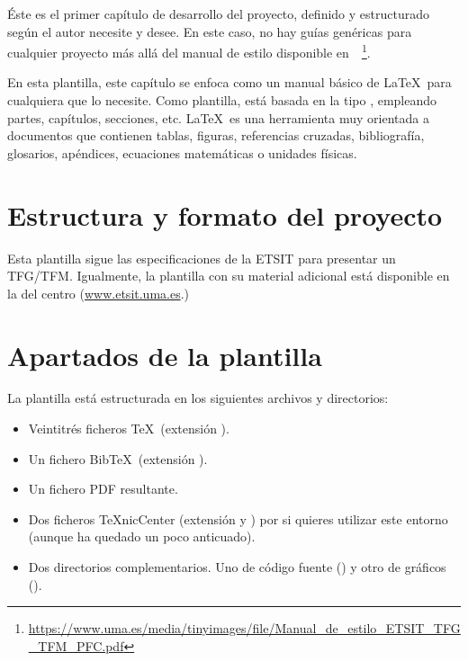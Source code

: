 \label{chp:ManLaTeX}
\minitoc

\begin{sinopsis}
\label{sec:chpltx:sinop}
Éste es el primer capítulo de desarrollo del proyecto, definido y estructurado según el autor necesite y desee. En este caso, no hay guías genéricas para cualquier proyecto más allá del manual de estilo disponible en~\cite{GuiaEstilo}~\footnote{\url{https://www.uma.es/media/tinyimages/file/Manual_de_estilo_ETSIT_TFG_TFM_PFC.pdf}}.

En esta plantilla, este capítulo se enfoca como un manual básico de \LaTeX\ para cualquiera que lo necesite. Como plantilla, está basada en la  tipo , empleando partes, capítulos, secciones, etc. \LaTeX\ es una herramienta muy orientada a documentos que contienen tablas, figuras, referencias cruzadas, bibliografía, glosarios, apéndices, ecuaciones matemáticas o unidades físicas.
\end{sinopsis}

\section{Estructura y formato del proyecto}
\label{sec:EstrForm}
Esta plantilla sigue las especificaciones de la ETSIT para presentar un TFG/TFM. Igualmente, la plantilla con su material adicional está disponible en la  del centro (\url{www.etsit.uma.es}.)

\section{Apartados de la plantilla}

La plantilla está estructurada en los siguientes archivos y directorios:

\begin{itemize}
	\item{Veintitrés ficheros \TeX\ (extensión ).}

	\item{Un fichero Bib\TeX\ (extensión ).}

	\item{Un fichero PDF resultante.}

	\item{Dos ficheros \TeX nicCenter (extensión  y ) por si quieres utilizar este entorno (aunque ha quedado un poco anticuado).}

	\item{Dos directorios complementarios.
		Uno de código fuente () y otro de gráficos ().}

\end{itemize}

